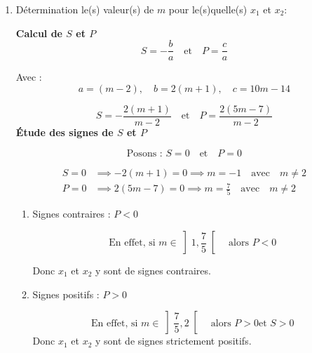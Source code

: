 \documentclass[12pt,a4paper]{article}
\begin{document}
\begin{enumerate}
\begin{itemize}
\textbf{Discussion selon les valeurs de \(m\)}

\begin{itemize}
    \item[•] Si \(m \in \left]-\infty, 1\right[ \cup \left]3, +\infty\right[\), alors \(\Delta_m < 0\), donc \(\mathcal{S}_\mathbb{R} = \emptyset\).
    
    \item[•] Si \(m \in \left]1, 3\right[\setminus\{2\}\), alors \(\Delta_m' > 0\), donc \((E_m)\) admet deux solutions distinctes.
    
    \item[•] Si \(m = 1\) ou \(m = 3\), alors \(\Delta_m' = 0\) donc \((E_m)\) admet une solution double.
\end{itemize}
\end{itemize}

\item Détermination le(s) valeur(s) de \(m\) pour le(s)quelle(s) \(x_{1}\) et \(x_{2}\):

\textbf{Calcul de \(S\) et \(P\)}
\[
S = -\frac{b}{a} \quad \text{et} \quad P = \frac{c}{a}
\]

Avec :
\[
a = (m-2), \quad b = 2(m+1), \quad c = 10m - 14
\]

\[
S = -\frac{2(m+1)}{m-2} \quad \text{et} \quad P = \frac{2(5m-7)}{m-2}
\]
\textbf{Étude des signes de \(S\) et \(P\)}

\[
\text{Posons : } S = 0 \quad \text{et} \quad P = 0
\]

\[
\begin{aligned}
S = 0 & \implies -2(m+1) = 0 \implies m = -1 \quad \text{avec} \quad m \neq 2 \\
P = 0 & \implies 2(5m-7) = 0 \implies m = \frac{7}{5} \quad \text{avec} \quad m \neq 2
\end{aligned}
\] 
\begin{enumerate}
\item Signes contraires : \(P < 0\)

\[
\text{En effet, si } m \in \left]1, \frac{7}{5}\right[ \quad \text{alors } P < 0
\]

Donc \(x_1\) et \(x_2\) y sont de signes contraires.

\item Signes positifs : \(P > 0\)

\[
\text{En effet, si } m \in\left]\frac{7}{5}, 2\right[ \quad \text{alors } P > 0 \text{et } S>0
\]
Donc \(x_1\) et \(x_2\) y  sont de signes strictement positifs.
\end{enumerate}
\end{enumerate}
\end{document}
